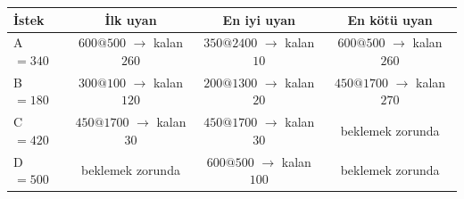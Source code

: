 \begin{tabular}{@{}lccc@{}}
\toprule
\textbf{İstek} & \textbf{İlk uyan} & \textbf{En iyi uyan} & \textbf{En kötü uyan}\\
\midrule
A $= 340$ & $600@500$ $\to$ kalan $260$ & $350@2400$ $\to$ kalan $10$ & $600@500$ $\to$ kalan $260$\\
B $= 180$ & $300@100$ $\to$ kalan $120$ & $200@1300$ $\to$ kalan $20$ & $450@1700$ $\to$ kalan $270$\\
C $= 420$ & $450@1700$ $\to$ kalan $30$ & $450@1700$ $\to$ kalan $30$ & \textcolor{red!60!black}{beklemek zorunda}\\
D $= 500$ & \textcolor{red!60!black}{beklemek zorunda} & $600@500$ $\to$ kalan $100$ & \textcolor{red!60!black}{beklemek zorunda}\\
\bottomrule
\end{tabular}
